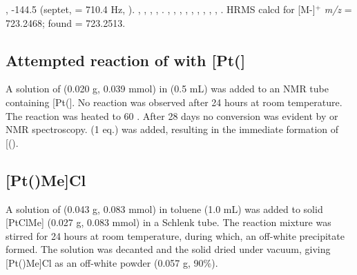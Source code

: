 \sloppypar{}
,
-144.5 (septet, \JPF{} = 710.4 Hz, ).
,
,
,
,
.
,
,
,
,
,
,
,
,
,
.
HRMS calcd for  [M-]$^+$ \emph{m/z} = 723.2468; found = 723.2513.

\subsection*{Attempted reaction of \tButhixantphos{} with [Pt(]}

A solution of \tButhixantphos{} (0.020 g, 0.039 mmol) in  (0.5 mL) was added to an NMR tube containing [Pt(].  No reaction was observed after 24 hours at room temperature.  The reaction was heated to 60 \degC{}.  After 28 days no conversion was evident by \phosphorus{} or \proton{} NMR spectroscopy.   (1 eq.) was added, resulting in the immediate formation of [(\tButhixantphos)\ce{H]+}.

\subsection*{[Pt(\tButhixantphosk)Me]Cl}


A solution of \tButhixantphos{} (0.043 g, 0.083 mmol) in toluene (1.0 mL) was added to solid [PtClMe] (0.027 g, 0.083 mmol) in a Schlenk tube.  The reaction mixture was stirred for 24 hours at room temperature, during which, an off-white precipitate formed.  The solution was decanted and the   solid dried under vacuum, giving [Pt(\tButhixantphos)Me]Cl as an off-white powder (0.057 g, 90\%).

